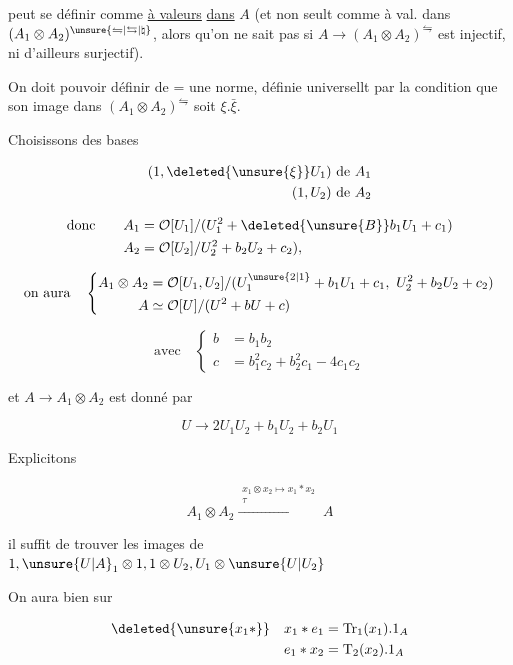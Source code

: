 
peut se définir comme \uline{à valeurs} \uline{dans} $A$ (et non seult comme à val. dans $(A_1\otimes A_2)^{\unsure{\leftrightharpoons|\leftrightarrows|\natural}}$, alors qu'on ne sait pas si $A\longrightarrow(A_1\otimes A_2)^{\leftrightharpoons}$ est  injectif, ni d'ailleurs surjectif).

On doit pouvoir définir de = une norme, définie universellt par la condition que son image dans $(A_1\otimes A_2)^{\leftrightharpoons}$ soit $\xi.\bar\xi$.

Choisissons des bases

\[
\begin{aligned}
(1,\deleted{\unsure{\xi}}U_1)&\ \text{de }A_1\\
(1,U_2)&\ \text{de }A_2
\end{aligned}
\]

\[
\begin{aligned}
\text{donc}\qquad A_1&=\mathcal O[U_1]/(U_1^2+\deleted{\unsure{B}}b_1U_1+c_1)\\
A_2&=\mathcal O[U_2]/U_2^2+b_2U_2+c_2),
\end{aligned}
\]

\[
\text{on aura}\quad
\left\{\begin{aligned}
A_1\otimes A_2&=\mathcal O[U_1,U_2]/(U_1^{\unsure{2|1}}+b_1U_1+c_1,\ U_2^2+b_2U_2+c_2)\\
A&\simeq\mathcal O[U]/(U^2+bU+c)
\end{aligned}\right.
\]

\[
\text{avec}\quad
\left\{\begin{aligned}
b&=b_1b_2\\
c&=b_1^2c_2+b_2^2c_1-4c_1c_2
\end{aligned}\right.
\]

et $A\longrightarrow A_1\otimes A_2$ est donné par

\[
U\longrightarrow2U_1U_2+b_1U_2+b_2U_1
\]

Explicitons

\[
A_1\otimes A_2\xrightarrow{\substack{x_1\otimes x_2\mapsto x_1*x_2\\\tau}}A
\]

il suffit de trouver les images de $1,\unsure{U|A}_1\otimes1,1\otimes U_2,U_1\otimes\unsure{U|U_2}$%


On aura bien sur

\[
\begin{aligned}
\deleted{\unsure{x_1*}}\quad x_1*e_1&=\mathrm{Tr}_1(x_1).1_A\\
e_1*x_2&=\mathrm T_2(x_2).1_A
\end{aligned}
\]



